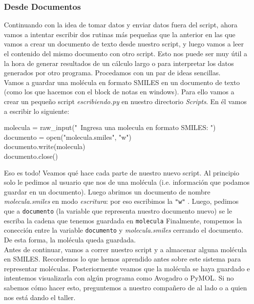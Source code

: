 \documentclass[10pt,letterpaper]{article}
\newcommand{\inlinecode}[1]{
\colorbox{light-gray}{\texttt{#1}}
}
\newenvironment{Code}
{
\begin{lrbox}{\selvestebox}%
\begin{minipage}{\dimexpr\columnwidth-2\fboxsep\relax}
\fontfamily{\ttdefault}\selectfont
}
{\end{minipage}\end{lrbox}%
\begin{center}
\colorbox{light-gray}{\usebox{\selvestebox}}
\end{center}
}
\begin{document}
\subsubsection{Desde Documentos}
Continuando con la idea de tomar datos y enviar datos fuera del script, ahora vamos a intentar escribir dos rutinas m\'as peque\~nas que la anterior en las que vamos a crear un documento de texto desde nuestro script, y luego vamos a leer el contenido del mismo documento con otro script. Esto nos puede ser muy \'util a la hora de generar resultados de un c\'alculo largo o para interpretar los datos generados por otro programa. Procedamos con un par de ideas sencillas.\\

Vamos a guardar una mol\'ecula en formato SMILES en un documento de texto (como los que hacemos con el block de notas en windows). Para ello vamos a crear un peque\~no script \textit{escribiendo.py} en nuestro directorio \textit{Scripts}. En \'el vamos a escribir lo siguiente:

\begin{Code}
molecula = raw\_input("\ \hspace{-2mm}Ingresa una molecula en formato SMILES: ")\\
documento = open("molecula.smiles", "w")\\
documento.write(molecula)\\
documento.close()
\end{Code}

Eso es todo! Veamos qu\'e hace cada parte de nuestro nuevo script. Al principio solo le pedimos al usuario que nos de una mol\'ecula (i.e. informaci\'on que podamos guardar en un documento). Luego abrimos un documento de nombre \textit{molecula.smiles} en modo \emph{escritura}: por eso escribimos la \inlinecode{"w"}. Luego, pedimos que a \inlinecode{documento} (la variable que representa nuestro documento nuevo) se le escriba la cadena que tenemos guardada en \inlinecode{molecula} Finalmente, rompemos la conecci\'on entre la variable \inlinecode{documento} y \textit{molecula.smiles} cerrando el documento. De esta forma, la mol\'ecula queda guardada.\\

Antes de continuar, vamos a correr nuestro script y a almacenar alguna mol\'ecula en SMILES. Recordemos lo que hemos aprendido antes sobre este sistema para representar mol\'eculas. Posteriormente veamos que la mol\'ecula se haya guardado e intentemos visualizarla con alg\'un programa como Avogadro o PyMOL. Si no sabemos c\'omo hacer esto, preguntemos a nuestro compa\~nero de al lado o a quien nos est\'a dando el taller.\\
\end{document}
